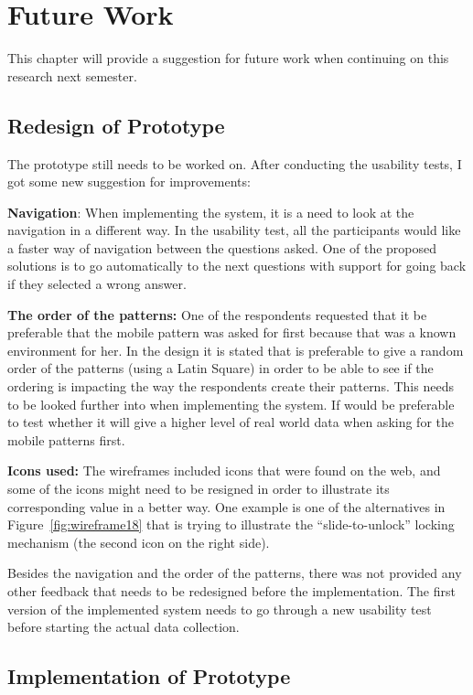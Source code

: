 \chapter{Future Work} \label{chap:FutureWork}

	This chapter will provide a suggestion for future work when continuing on this research next semester.

\section{Redesign of Prototype}
  
  The prototype still needs to be worked on. After conducting the usability tests, I got some new suggestion for improvements:

	{\bf Navigation}: When implementing the system, it is a need to look at the navigation in a different way. In the usability test, all the participants would like a faster way of navigation between the questions asked. One of the proposed solutions is to go automatically to the next questions with support for going back if they selected a wrong answer.

	{\bf The order of the patterns:} One of the respondents requested that it be preferable that the mobile pattern was asked for first because that was a known environment for her. In the design it is stated that is preferable to give a random order of the patterns (using a Latin Square) in order to be able to see if the ordering is impacting the way the respondents create their patterns. This needs to be looked further into when implementing the system. If would be preferable to test whether it will give a higher level of real world data when asking for the mobile patterns first.

	{\bf Icons used:} The wireframes included icons that were found on the web, and some of the icons might need to be resigned in order to illustrate its corresponding value in a better way. One example is one of the alternatives in Figure~\ref{fig:wireframe18} that is trying to illustrate the ``slide-to-unlock'' locking mechanism (the second icon on the right side).

	Besides the navigation and the order of the patterns, there was not provided any other feedback that needs to be redesigned before the implementation. The first version of the implemented system needs to go through a new usability test before starting the actual data collection.

	\section{Implementation of Prototype}

